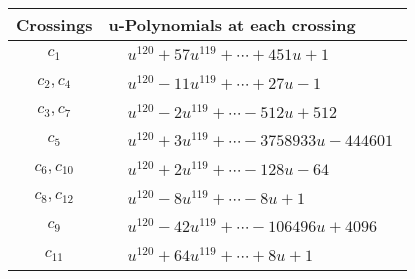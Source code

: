 \documentclass[1p]{elsarticle_modified}
\theoremstyle{definition}
\begin{document}
\begin{tabular}{m{50pt}|m{274pt}}
Crossings & \hspace{64pt}u-Polynomials at each crossing \\
\hline $$\begin{aligned}c_{1}\end{aligned}$$&$\begin{aligned}
&u^{120}+57 u^{119}+\cdots+451 u+1
\end{aligned}$\\
\hline $$\begin{aligned}c_{2},c_{4}\end{aligned}$$&$\begin{aligned}
&u^{120}-11 u^{119}+\cdots+27 u-1
\end{aligned}$\\
\hline $$\begin{aligned}c_{3},c_{7}\end{aligned}$$&$\begin{aligned}
&u^{120}-2 u^{119}+\cdots-512 u+512
\end{aligned}$\\
\hline $$\begin{aligned}c_{5}\end{aligned}$$&$\begin{aligned}
&u^{120}+3 u^{119}+\cdots-3758933 u-444601
\end{aligned}$\\
\hline $$\begin{aligned}c_{6},c_{10}\end{aligned}$$&$\begin{aligned}
&u^{120}+2 u^{119}+\cdots-128 u-64
\end{aligned}$\\
\hline $$\begin{aligned}c_{8},c_{12}\end{aligned}$$&$\begin{aligned}
&u^{120}-8 u^{119}+\cdots-8 u+1
\end{aligned}$\\
\hline $$\begin{aligned}c_{9}\end{aligned}$$&$\begin{aligned}
&u^{120}-42 u^{119}+\cdots-106496 u+4096
\end{aligned}$\\
\hline $$\begin{aligned}c_{11}\end{aligned}$$&$\begin{aligned}
&u^{120}+64 u^{119}+\cdots+8 u+1
\end{aligned}$\\
\hline
\end{tabular}\\~\\
\end{document}
